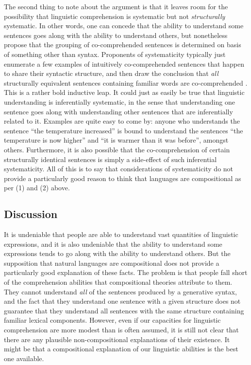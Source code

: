 The second thing to note about the argument is that it leaves room for the possibility that linguistic comprehension is systematic but not \textit{structurally} systematic. In other words, one can concede that the ability to understand some sentences goes along with the ability to understand others, but nonetheless propose that the grouping of co-comprehended sentences is determined on basis of something other than syntax. Proponents of systematicity typically just enumerate a few examples of intuitively co-comprehended sentences that happen to share their syntactic structure, and then draw the conclusion that \textit{all} structurally equivalent sentences containing familiar words are co-comprehended \citep[e.g.,][]{FodorPylyshyn:1988}. This is a rather bold inductive leap. It could just as easily be true that linguistic understanding is inferentially systematic, in the sense that understanding one sentence goes along with understanding other sentences that are inferentially related to it. Examples are quite easy to come by: anyone who understands the sentence ``the temperature increased'' is bound to understand the sentences ``the temperature is now higher'' and ``it is warmer than it was before'', amongst others. Furthermore, it is also possible that the co-comprehension of certain structurally identical sentences is simply a side-effect of such inferential systematicity. All of this is to say that considerations of systematicity do not provide a particularly good reason to think that languages are compositional as per (1) and (2) above. 

\subsection{Discussion}

It is undeniable that people are able to understand vast quantities of linguistic expressions, and it is also undeniable that the ability to understand some expressions tends to go along with the ability to understand others. But the supposition that natural languages are compositional does not provide a particularly good explanation of these facts. The problem is that people fall short of the comprehension abilities that compositional theories attribute to them. They cannot understand \textit{all} of the sentences produced by a generative syntax, and the fact that they understand one sentence with a given structure does not guarantee that they understand all sentences with the same structure containing familiar lexical components. However, even if our capacities for linguistic comprehension are more modest than is often assumed, it is still not clear that there are any plausible non-compositional explanations of their existence. It might be that a compositional explanation of our linguistic abilities is the best one available. 


